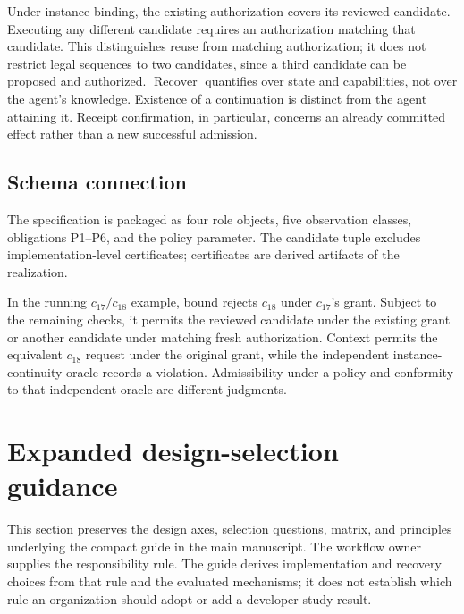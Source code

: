 Under instance binding, the existing authorization covers its reviewed candidate. Executing any different candidate requires an authorization matching that candidate. This distinguishes reuse from matching authorization; it does not restrict legal sequences to two candidates, since a third candidate can be proposed and authorized. $\operatorname{Recover}$ quantifies over state and capabilities, not over the agent's knowledge. Existence of a continuation is distinct from the agent attaining it. Receipt confirmation, in particular, concerns an already committed effect rather than a new successful admission.

\subsection{Schema connection}
The specification is packaged as four role objects, five observation classes, obligations P1--P6, and the policy parameter. The candidate tuple excludes implementation-level certificates; certificates are derived artifacts of the realization.

In the running $c_{17}/c_{18}$ example, bound rejects $c_{18}$ under $c_{17}$'s grant. Subject to the remaining checks, it permits the reviewed candidate under the existing grant or another candidate under matching fresh authorization. Context permits the equivalent $c_{18}$ request under the original grant, while the independent instance-continuity oracle records a violation. Admissibility under a policy and conformity to that independent oracle are different judgments.

\section{Expanded design-selection guidance}
\label{app:design-guidance}
This section preserves the design axes, selection questions, matrix, and principles underlying the compact guide in the main manuscript. The workflow owner supplies the responsibility rule. The guide derives implementation and recovery choices from that rule and the evaluated mechanisms; it does not establish which rule an organization should adopt or add a developer-study result.

